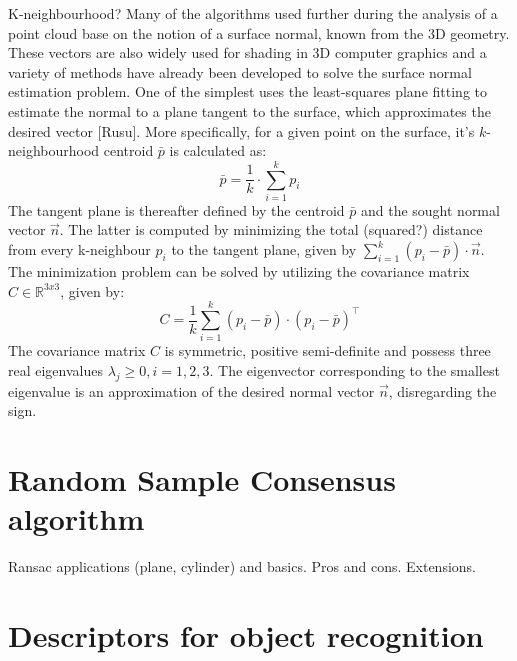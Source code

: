 K-neighbourhood? Many of the algorithms used further during the analysis of a point cloud base on the notion of a surface normal, known from the 3D geometry. These vectors are also widely used for shading in 3D computer graphics and a variety of methods have already been developed to solve the surface normal estimation problem. One of the simplest uses the least-squares plane fitting to estimate the normal to a plane tangent to the surface, which approximates the desired vector [Rusu]. More specifically, for a given point on the surface, it's $k$-neighbourhood centroid $\bar{p}$ is calculated as:
\begin{equation} 
\bar{p} = \frac{1}{k} \cdot \sum\limits_{i=1}^{k} p_i 
\end{equation}
The tangent plane is thereafter defined by the centroid $\bar{p}$ and the sought normal vector $\vec{n}$. The latter is computed by minimizing the total (squared?) distance from every k-neighbour $p_i$ to the tangent plane, given by $\sum\limits_{i=1}^{k} (p_i - \bar{p})\cdot \vec{n}$. The minimization problem can be solved by utilizing the covariance matrix $C \in \mathbb{R}^{3x3}$, given by:
\begin{equation}
C = \frac{1}{k}\sum\limits_{i=1}^{k}(p_i - \bar{p})\cdot (p_i - \bar{p})^\intercal
\end{equation}
The covariance matrix $C$ is symmetric, positive semi-definite and possess three real eigenvalues $\lambda_j \geq 0, i = 1,2,3$. The eigenvector corresponding to the smallest eigenvalue is an approximation of the desired normal vector $\vec{n}$, disregarding the sign.



\section{Random Sample Consensus algorithm}
\label{sec:ransac}

Ransac applications (plane, cylinder) and basics. Pros and cons. Extensions. 


\section{Descriptors for object recognition}
\label{sec:descriptors}



